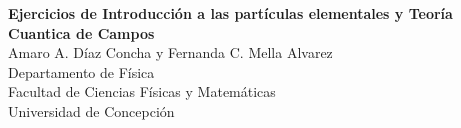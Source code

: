 \documentclass[twoside]{report}
\numberwithin{equation}{chapter} %
\begin{document}
\thispagestyle{empty}
\begin{titlepage}
\centering

\vspace*{\fill}  %

{\Huge \textbf{Ejercicios de Introducción a las partículas elementales y Teoría Cuantica de Campos}}\\[2cm]
{\Large Amaro A. Díaz Concha y Fernanda C. Mella Alvarez}\\[1cm]
{\normalsize Departamento de Física\\
Facultad de Ciencias Físicas y Matemáticas\\
Universidad de Concepción}\\[2cm]

\vspace*{\fill}  %

\end{titlepage}

\setcounter{page}{1}


%

\tableofcontents
{}
\setcounter{page}{1}


\newpage


 














%

%

\end{document}
